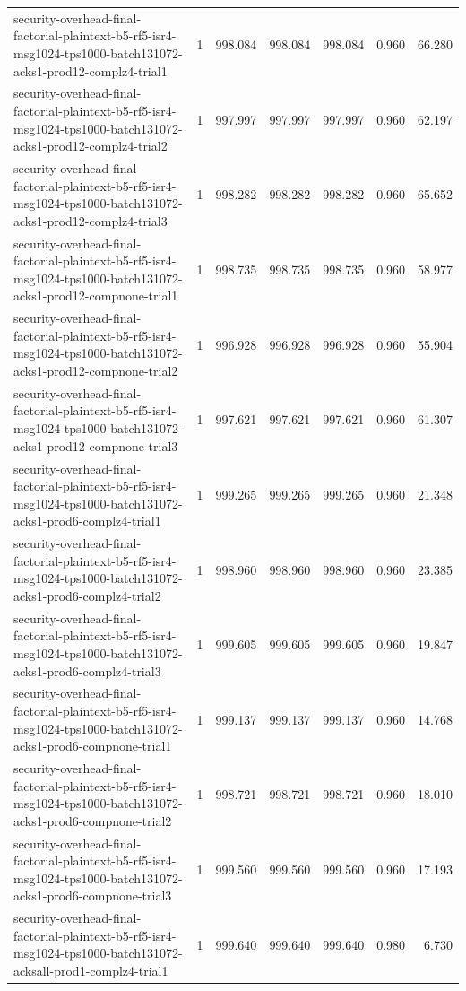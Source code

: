 \begin{tabular}{lrrrrrr}
security-overhead-final-factorial-plaintext-b5-rf5-isr4-msg1024-tps1000-batch131072-acks1-prod12-complz4-trial1 & 1 & 998.084 & 998.084 & 998.084 & 0.960 & 66.280 \\
security-overhead-final-factorial-plaintext-b5-rf5-isr4-msg1024-tps1000-batch131072-acks1-prod12-complz4-trial2 & 1 & 997.997 & 997.997 & 997.997 & 0.960 & 62.197 \\
security-overhead-final-factorial-plaintext-b5-rf5-isr4-msg1024-tps1000-batch131072-acks1-prod12-complz4-trial3 & 1 & 998.282 & 998.282 & 998.282 & 0.960 & 65.652 \\
security-overhead-final-factorial-plaintext-b5-rf5-isr4-msg1024-tps1000-batch131072-acks1-prod12-compnone-trial1 & 1 & 998.735 & 998.735 & 998.735 & 0.960 & 58.977 \\
security-overhead-final-factorial-plaintext-b5-rf5-isr4-msg1024-tps1000-batch131072-acks1-prod12-compnone-trial2 & 1 & 996.928 & 996.928 & 996.928 & 0.960 & 55.904 \\
security-overhead-final-factorial-plaintext-b5-rf5-isr4-msg1024-tps1000-batch131072-acks1-prod12-compnone-trial3 & 1 & 997.621 & 997.621 & 997.621 & 0.960 & 61.307 \\
security-overhead-final-factorial-plaintext-b5-rf5-isr4-msg1024-tps1000-batch131072-acks1-prod6-complz4-trial1 & 1 & 999.265 & 999.265 & 999.265 & 0.960 & 21.348 \\
security-overhead-final-factorial-plaintext-b5-rf5-isr4-msg1024-tps1000-batch131072-acks1-prod6-complz4-trial2 & 1 & 998.960 & 998.960 & 998.960 & 0.960 & 23.385 \\
security-overhead-final-factorial-plaintext-b5-rf5-isr4-msg1024-tps1000-batch131072-acks1-prod6-complz4-trial3 & 1 & 999.605 & 999.605 & 999.605 & 0.960 & 19.847 \\
security-overhead-final-factorial-plaintext-b5-rf5-isr4-msg1024-tps1000-batch131072-acks1-prod6-compnone-trial1 & 1 & 999.137 & 999.137 & 999.137 & 0.960 & 14.768 \\
security-overhead-final-factorial-plaintext-b5-rf5-isr4-msg1024-tps1000-batch131072-acks1-prod6-compnone-trial2 & 1 & 998.721 & 998.721 & 998.721 & 0.960 & 18.010 \\
security-overhead-final-factorial-plaintext-b5-rf5-isr4-msg1024-tps1000-batch131072-acks1-prod6-compnone-trial3 & 1 & 999.560 & 999.560 & 999.560 & 0.960 & 17.193 \\
security-overhead-final-factorial-plaintext-b5-rf5-isr4-msg1024-tps1000-batch131072-acksall-prod1-complz4-trial1 & 1 & 999.640 & 999.640 & 999.640 & 0.980 & 6.730 \\

\end{tabular}
